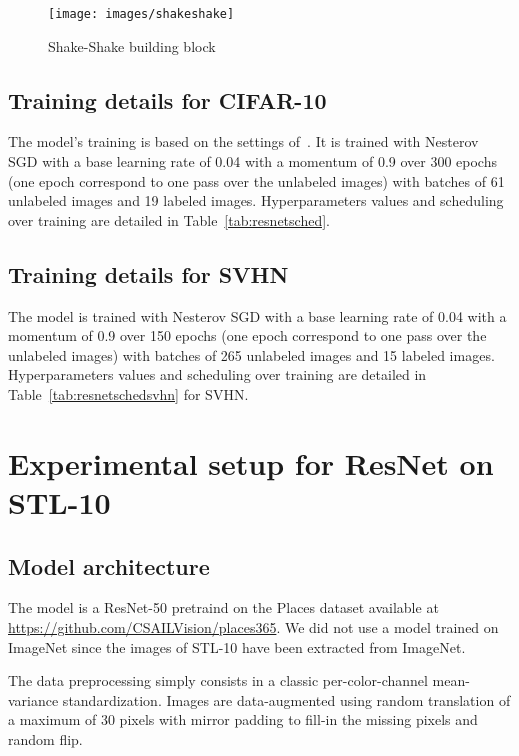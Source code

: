 \documentclass[runningheads]{llncs}
\begin{document}
\begin{figure}[!tb]
	\centering
    \texttt{[image: images/shakeshake]}
    \caption[]{Shake-Shake building block}
    \label{fig:shake}
\end{figure}

\subsection{Training details for CIFAR-10}

The model's training is based on the settings of~\cite{Tarvainen2017}. It is trained with Nesterov SGD with a base learning rate of 0.04 with a momentum of 0.9 over 300 epochs (one epoch correspond to one pass over the unlabeled images) with batches of 61 unlabeled images and 19 labeled images. Hyperparameters values and scheduling over training are detailed in Table~\ref{tab:resnetsched}.

\subsection{Training details for SVHN}

The model is trained with Nesterov SGD with a base learning rate of 0.04 with a momentum of 0.9 over 150 epochs (one epoch correspond to one pass over the unlabeled images) with batches of 265 unlabeled images and 15 labeled images. Hyperparameters values and scheduling over training are detailed in Table~\ref{tab:resnetschedsvhn} for SVHN.


\section{Experimental setup for ResNet on STL-10}

\subsection{Model architecture}

The model is a ResNet-50 pretraind on the Places dataset available at \url{https://github.com/CSAILVision/places365}. We did not use a model trained on ImageNet since the images of STL-10 have been extracted from ImageNet.

The data preprocessing simply consists in a classic per-color-channel mean-variance standardization. Images are data-augmented using random translation of a maximum of 30 pixels with mirror padding to fill-in the missing pixels and random flip.
\end{document}
